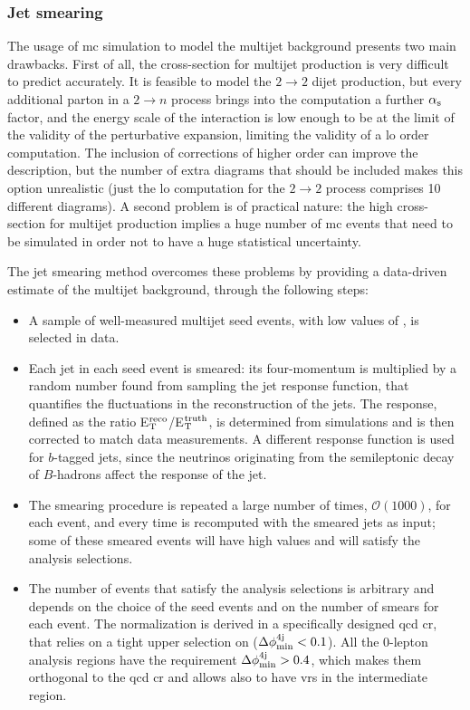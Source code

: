 \subsubsection*{Jet smearing}
\label{sec:jet_smearing}

The usage of \gls{mc} simulation to model the multijet background presents two main drawbacks.
First of all, the cross-section for multijet production is very difficult to predict accurately. 
It is feasible to model the $2 \to 2$ dijet production, 
but every additional parton in a $2 \to n$ process brings into the computation a further $\alpha_{\rm{s}}$ factor, 
and the energy scale of the interaction is low enough to be at the limit of the validity of the perturbative expansion, limiting the validity of a  \gls{lo} order computation. The inclusion of corrections of higher order can improve the description, but the number of extra diagrams that should be included makes this option unrealistic (just the \gls{lo} computation for the $2 \to 2$ process comprises 10 different diagrams).
A second problem is of practical nature: the high cross-section for multijet production implies a huge number of \gls{mc} events that need to be simulated in order not to have a huge statistical uncertainty. 

The jet smearing method overcomes these problems by providing a data-driven estimate of the multijet background, through the following steps:
\begin{itemize}
\item A sample of well-measured multijet seed events, with low values of \met, is selected in data.

\item Each jet in each seed event is smeared: its four-momentum is multiplied by a random number found from sampling the jet response function, that quantifies the fluctuations in the \pt reconstruction of the jets. The response, defined as the ratio E$_{\rm{T}}^{\rm{reco}}$/E$_{\rm{T}}^{\rm{truth}}$, is determined from simulations and is then corrected to match data measurements. 
A different response function is used for $b$-tagged jets, 
since the neutrinos originating from the semileptonic decay of $B$-hadrons affect the response of the jet. 
 

\item The smearing procedure is repeated a large number of times, $\mathcal{O}(1000)$, for each event, and every time \met is recomputed with the smeared jets as input; some of these smeared events will have high \met values and will satisfy the analysis selections.

\item The number of events that satisfy the analysis selections is arbitrary and depends on the choice of the seed events and on the number of smears for each event. The normalization is derived in a specifically designed \gls{qcd} \gls{cr}, that relies on a tight upper selection on \dphimin ($\Delta\phi_{\rm{min}}^{4{\rm{j}}} < 0.1$). All the 0-lepton analysis regions have the requirement $\Delta\phi_{\rm{min}}^{4{\rm{j}}} > 0.4$, which makes them orthogonal to the \gls{qcd} \gls{cr} and allows also to have \glspl{vr} in the intermediate region. 
\end{itemize}

